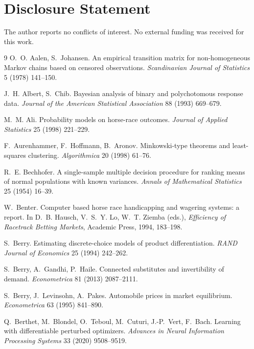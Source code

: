 \documentclass[12pt]{article}
\theoremstyle{remark}
\begin{document}
\section*{Disclosure Statement}

The author reports no conflicts of interest. No external funding was
received for this work.

\begin{thebibliography}{9}
 O.~O. Aalen, S.~Johansen.
An empirical transition matrix for non-homogeneous Markov chains based on
censored observations. \emph{Scandinavian Journal of Statistics} 5
(1978) 141--150.

 J.~H. Albert, S.~Chib.
Bayesian analysis of binary and polychotomous response data.
\emph{Journal of the American Statistical Association} 88 (1993)
669--679.

 M.~M. Ali. Probability models on horse-race
outcomes. \emph{Journal of Applied Statistics} 25 (1998) 221--229.

 F.~Aurenhammer, F.~Hoffmann, B.~Aronov.
Minkowski-type theorems and least-squares clustering.
\emph{Algorithmica} 20 (1998) 61--76.

 R.~E. Bechhofer. A single-sample
multiple decision procedure for ranking means of normal populations with
known variances. \emph{Annals of Mathematical Statistics} 25 (1954)
16--39.

 W.~Benter. Computer based horse
race handicapping and wagering systems: a report. In D.~B. Hausch,
V.~S.~Y. Lo, W.~T. Ziemba (eds.), \emph{Efficiency of Racetrack
Betting Markets}, Academic Press, 1994, 183--198.

 S.~Berry. Estimating discrete-choice
models of product differentiation. \emph{RAND Journal of Economics} 25
(1994) 242--262.

 S.~Berry, A.~Gandhi, P.~Haile. Connected substitutes
and invertibility of demand. \emph{Econometrica} 81 (2013) 2087--2111.

 S.~Berry, J.~Levinsohn, A.~Pakes. Automobile prices in
market equilibrium. \emph{Econometrica} 63 (1995) 841--890.

 Q.~Berthet, M.~Blondel, O.~Teboul, M.~Cuturi,
J.-P.~Vert, F.~Bach. Learning with differentiable perturbed optimizers.
\emph{Advances in Neural Information Processing Systems} 33 (2020)
9508--9519.


\end{thebibliography}
\end{document}
